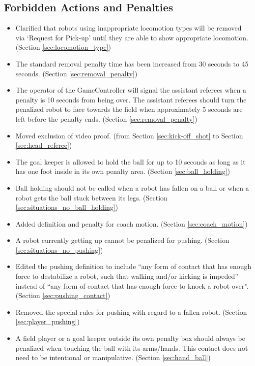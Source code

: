 \documentclass[12pt]{article}
\begin{document}
\subsection*{Forbidden Actions and Penalties}
\begin{itemize}
	\item Clarified that robots using inappropriate locomotion types will be removed via `Request for Pick-up' until they are able to show appropriate locomotion. (Section \ref{sec:locomotion_type})
        \item The standard removal penalty time has been increased from 30 seconds to 45 seconds. (Section \ref{sec:removal_penalty})
	\item The operator of the GameController will signal the assistant referees when a penalty is 10 seconds from being over. The assistant referees should turn the penalized robot to face towards the field when approximately 5 seconds are left before the penalty ends. (Section \ref{sec:removal_penalty})
	\item Moved exclusion of video proof.  (from Section \ref{sec:kick-off_shot} to Section \ref{sec:head_referee})
        \item The goal keeper is allowed to hold the ball for up to 10 seconds as long as it has one foot inside in its own penalty area. (Section \ref{sec:ball_holding})
	\item Ball holding should not be called when a robot has fallen on a ball or when a robot gets the ball stuck between its legs. (Section \ref{sec:situations_no_ball_holding})
	\item Added definition and penalty for coach motion. (Section \ref{sec:coach_motion})
	\item A robot currently getting up cannot be penalized for pushing. (Section \ref{sec:situations_no_pushing})
	\item Edited the pushing definition to include ``any form of contact that has enough force to destabilize a robot, such that walking and/or kicking is impeded'' instead of ``any form of contact that has enough force to knock a robot over''. (Section \ref{sec:pushing_contact})
	\item Removed the special rules for pushing with regard to a fallen robot. (Section \ref{sec:player_pushing})
	\item A field player or a goal keeper outside its own penalty box should always be penalized when touching the ball with its arms/hands.  This contact does not need to be intentional or manipulative. (Section \ref{sec:hand_ball})

\end{itemize}
\end{document}
